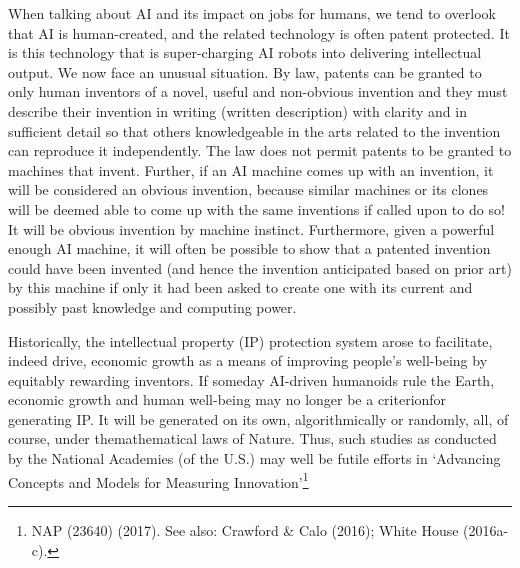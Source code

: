 \begin{multicols}{2}
When talking about AI and its impact on jobs for humans, we tend to overlook that AI is human-created, and the related technology is often patent protected. It is this technology that is super-charging AI robots into delivering intellectual output. We now face an unusual situation. By law, patents can be granted to only human inventors of a novel, useful and non-obvious invention and they must describe their invention in writing (written description) with clarity and in sufficient detail so that others knowledgeable in the arts related to the invention can reproduce it independently. The law does not permit patents to be granted to machines that invent. Further, if an AI machine comes up with an invention, it will be considered an obvious invention, because similar machines or its clones will be deemed able to come up with the same inventions if called upon to do so! It will be obvious invention by machine instinct. Furthermore, given a powerful enough AI machine, it will often be possible to show that a patented invention could have been invented (and hence the invention anticipated based on prior art) by this machine if only it had been asked to create one with its current and possibly past knowledge and computing power.

Historically, the intellectual property (IP) protection system arose to facilitate, indeed drive, economic growth as a means of improving people's well-being by equitably rewarding inventors. If someday AI-driven humanoids rule the Earth, economic growth and human well-being may no longer be a criterionfor generating IP. It will be generated on its own, algorithmically or randomly, all, of course, under themathematical laws of Nature. Thus, such studies as conducted by the National Academies (of the U.S.) may well be futile efforts in ‘Advancing Concepts and Models for Measuring Innovation’\footnote{NAP (23640) (2017). See also: Crawford \& Calo (2016); White House (2016a-c).}  


\end{multicols}
